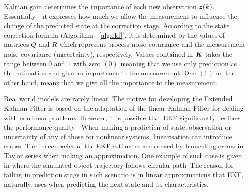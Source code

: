 
Kalman gain determines the importance of each new observation $\boldsymbol{z}(k)$. Essentially - it expresses how much we allow the measurement to influence the change of the predicted state at the correction stage. According to the state correction formula (Algorithm ~\ref{alg:ekf}), it is determined by the values of matrices $Q$ and $R$ which represent process noise covariance and the measurement noise covariance (uncertainty), respectively. Values contained in $\boldsymbol{K}$ takes the range between $0$ and $1$ with zero $(0)$ meaning that we use only prediction as the estimation and give no importance to the measurement. One $(1)$ on the other hand, means that we give all the importance to the measurement.%

Real world models are rarely linear. The motive for developing the Extended Kalman Filter is based on the adaptation of the linear Kalman Filter for dealing with nonlinear problems. However, it is possible that EKF significantly declines the performance quality \cite{julier96}. When making a prediction of state, observation or uncertainty of any of those for nonlinear systems, linearisation can introduce errors. The inaccuracies of the EKF estimates are caused by truncating errors in Taylor series when making an approximation. One example of such case is given in \cite{julier96} where the simulated object trajectory follows circular path. The reason for failing in prediction stage in such scenario is in linear approximations that EKF, naturally, uses when predicting the next state and its characteristics.
